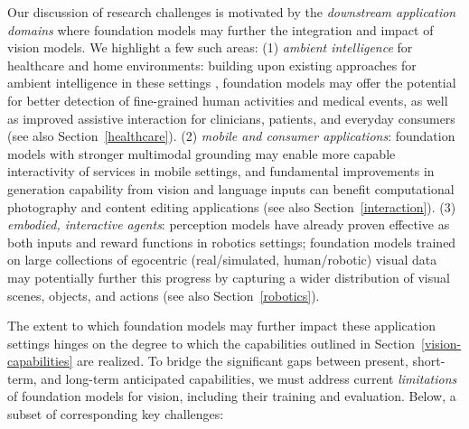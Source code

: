 Our discussion of research challenges is motivated by the \textit{downstream application domains} where foundation models may further the integration and impact of vision models. We highlight a few such areas: (1) \textit{ambient intelligence} for healthcare and home environments: building upon existing approaches for ambient intelligence in these settings \cite{haque2017towards, lyytinen2002ubiquitous, hong2004architecture}, foundation models may offer the potential for better detection of fine-grained human activities and medical events, as well as improved assistive interaction for clinicians, patients, and everyday consumers (see also Section~\ref{healthcare}).
(2) \textit{mobile and consumer applications}: foundation models with stronger multimodal grounding may enable more capable interactivity of services in mobile settings, and fundamental improvements in generation capability from vision and language inputs can benefit computational photography and content editing applications  \cite{delbracio2021mobile,ramesh2021zeroshot,park2019gaugan} (see also Section~\ref{interaction}).
(3) \textit{embodied, interactive agents}: perception models have already proven effective as both inputs  \cite{sermanet2018time} and reward functions  \cite{chen2021generalizable,shao2020concept2robot} in robotics settings; foundation models trained on large collections of egocentric (real/simulated, human/robotic) visual data \cite{damen2018kitchens,chen2021geosim} may potentially further this progress by capturing a wider distribution of visual scenes, objects, and actions (see also Section~\ref{robotics}).

The extent to which foundation models may further impact these application settings hinges on the degree to which the capabilities outlined in Section~\ref{vision-capabilities} are realized. To bridge the significant gaps between present, short-term, and long-term anticipated capabilities, we must address current \textit{limitations} of foundation models for vision, including their training and evaluation. Below, a subset of corresponding key challenges:

